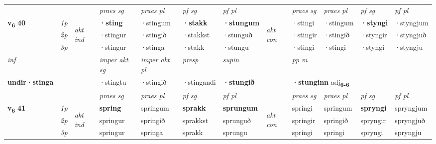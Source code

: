 \begin{longtable}[l]{X>{\footnotesize\itshape}llXXXXlXXXX}
\midrule

 & &   & \textit{praes sg}  & \textit{praes pl}    & \textit{ pf sg} & \textit{pf pl} & & \textit{praes sg}  & \textit{praes pl}    & \textit{pf sg} & \textit{pf pl }  \\ \cmidrule{4-7} \cmidrule{9-12}
 \multirow{2}{*}{{{\textbf{v{\textsubscript{6}}} \Large{\textbf{40}}}}}  & 1p & \multirow{3}{*}{\begin{turn}{90}\textit{akt ind}\end{turn}} & \textbf{·sting} & ·stingum & \textbf{·stakk} & \textbf{·stungum} & \multirow{3}{*}{\begin{turn}{90}\textit{akt con}\end{turn}} &·stingi & ·stingum & \textbf{·styngi} & ·styngjum\\*
 & 2p &  &  ·stingur  & ·stingið & ·stakkst & ·stunguð & & ·stingir & ·stingið & ·styngir & ·styngjuð \\*
 & 3p &  & ·stingur & ·stinga & ·stakk & ·stungu & & ·stingi & ·stingi& ·styngi & ·styngju \\*
\cmidrule{4-7} \cmidrule{9-12}

   {\textit{inf}} & &  & \textit{imper akt sg} & \textit{imper akt pl}   & \textit{presp} & \textit{supin}  && \textit{pp m} \\*
  {\textbf{undir\allowbreak ·stinga}} & && ·stingtu  & ·stingið   & ·stingandi &  \textbf{·stungið}  && \multicolumn{2}{l}{\textbf{·stunginn} adj\textbf{\textsubscript{6-6}}} \\*

\midrule

 & &   & \textit{praes sg}  & \textit{praes pl}    & \textit{ pf sg} & \textit{pf pl} & & \textit{praes sg}  & \textit{praes pl}    & \textit{pf sg} & \textit{pf pl }  \\ \cmidrule{4-7} \cmidrule{9-12}
 \multirow{2}{*}{{{\textbf{v{\textsubscript{6}}} \Large{\textbf{41}}}}}  & 1p & \multirow{3}{*}{\begin{turn}{90}\textit{akt ind}\end{turn}} & \textbf{spring} & springum & \textbf{sprakk} & \textbf{sprungum} & \multirow{3}{*}{\begin{turn}{90}\textit{akt con}\end{turn}} &springi & springum & \textbf{spryngi} & spryngjum\\*
 & 2p &  &  springur  & springið & sprakkst & sprunguð & & springir & springið & spryngir & spryngjuð \\*
 & 3p &  & springur & springa & sprakk & sprungu & & springi & springi& spryngi & spryngju \\*
\cmidrule{4-7} \cmidrule{9-12}


\end{longtable}
